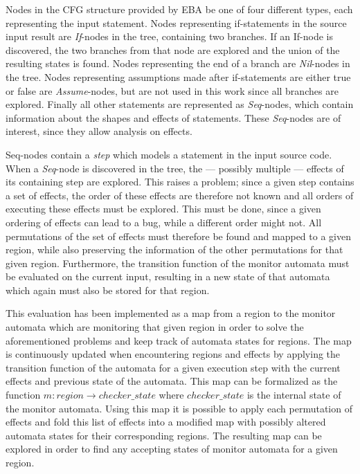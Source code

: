 \newpar Nodes in the CFG structure provided by EBA be one of four different types, each representing the input statement. Nodes representing if-statements in the source input result are \textit{If}-nodes in the tree, containing two branches. If an If-node is discovered, the two branches from that node are explored and the union of the resulting states is found. Nodes representing the end of a branch are \textit{Nil}-nodes in the tree. Nodes representing assumptions made after if-statements are either true or false are \textit{Assume}-nodes, but are not used in this work since all branches are explored. Finally all other statements are represented as \textit{Seq}-nodes, which contain information about the shapes and effects of statements. These \textit{Seq}-nodes are of interest, since they allow analysis on effects.  

\newpar Seq-nodes contain a \textit{step} which models a statement in the input source code. When a \textit{Seq}-node is discovered in the tree, the --- possibly multiple --- effects of its containing step are explored. This raises a problem; since a given step contains a set of effects, the order of these effects are therefore not known and all orders of executing these effects must be explored. This must be done, since a given ordering of effects can lead to a bug, while a different order might not. All permutations of the set of effects must therefore be found and mapped to a given region, while also preserving the information of the other permutations for that given region. Furthermore, the transition function of the monitor automata must be evaluated on the current input, resulting in a new state of that automata which again must also be stored for that region. 

\newpar This evaluation has been implemented as a map from a region to the monitor automata which are monitoring that given region in order to solve the aforementioned problems and keep track of automata states for regions. The map is continuously updated when encountering regions and effects by applying the transition function of the automata for a given execution step with the current effects and previous state of the automata. This map can be formalized as the function $m: region \rightarrow { checker\_state }$ where $ checker\_state $ is the internal state of the monitor automata. Using this map it is possible to apply each permutation of effects and fold this list of effects into a modified map with possibly altered automata states for their corresponding regions. The resulting map can be explored in order to find any accepting states of monitor automata for a given region. 

